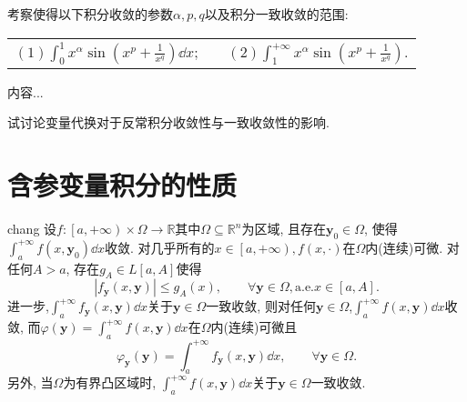\begin{quizb}
\woe 考察使得以下积分收敛的参数\(\alpha,p,q\)以及积分一致收敛的范围:\vspace{8pt}\\
\begin{tabular}{lcl}
\((1)\int_{0}^{1}x^\alpha\sin\left(x^p+\frac{1}{x^q}\right)\dd x\);&&\((2)\int_{1}^{+\infty}x^\alpha\sin\left(x^p+\frac{1}{x^q}\right)\).
\end{tabular}
\begin{solution}
内容...
\end{solution}
\woe 试讨论变量代换对于反常积分收敛性与一致收敛性的影响.
\end{quizb}
\section{含参变量积分的性质}
\begin{theorem}{}{chang}
设\(f:\left[a,+\infty\right)\times\varOmega\rightarrow\mathbb{R}\)其中\(\varOmega\subseteq\mathbb{R}^n\)为区域, 且存在\(\boldsymbol{y}_0\in\varOmega\), 使得\(\int_{a}^{+\infty}f(x,\boldsymbol{y}_0)\dd x\)收敛. 对几乎所有的\(x\in\left[a,+\infty\right),f(x,\cdot)\)在\(\varOmega\)内(连续)可微. 对任何\(A>a\), 存在\(g_A\in L[a,A]\)使得\[\left|f_{\boldsymbol{y}}(x,\boldsymbol{y})\right|\leqslant g_A(x),\qquad\forall\boldsymbol{y}\in\varOmega,\mathrm{a.e.}x\in[a,A].\]进一步,\(\int_{a}^{+\infty}f_{\boldsymbol{y}}(x,\boldsymbol{y})\dd x\)关于\(\boldsymbol{y}\in\varOmega\)一致收敛, 则对任何\(\boldsymbol{y}\in\varOmega\),\(\int_{a}^{+\infty}f(x,\boldsymbol{y})\dd x\)收敛, 而\(\varphi(\boldsymbol{y})=\int_{a}^{+\infty}f(x,\boldsymbol{y})\dd x\)在\(\Omega\)内(连续)可微且\[\varphi_{\boldsymbol{y}}(\boldsymbol{y})=\int_{a}^{+\infty}f_{\boldsymbol{y}}(x,\boldsymbol{y})\dd x,\qquad\forall\boldsymbol{y}\in\varOmega.\]另外, 当\(\varOmega\)为有界凸区域时, \(\int_{a}^{+\infty}f(x,\boldsymbol{y})\dd x\)关于\(\boldsymbol{y}\in\varOmega\)一致收敛.
\end{theorem}
